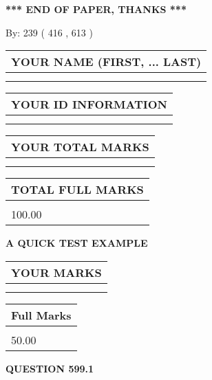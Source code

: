 \documentclass[12pt]{article}
\begin{document}
\vspace{1.0in} 
{\textbf{\large{ *** END OF PAPER, THANKS *** }}} 
   
   
\hspace{1.0in} By: 
 239 ( 416 ,  613 )
   
   
   
   
\newpage 
\setcounter{page}{ 
   599001 } 
   
   
   
   
\noindent\begin{tabular}{|l|}
\hline
YOUR NAME (FIRST, ... LAST)  \\
\hline
 \\ 
 \\ 
\hline
\end{tabular}
\hspace{0.05in} \begin{tabular}{|l|}
\hline
 YOUR   ID   INFORMATION  \\
\hline
 \\ 
 \\ 
\hline
\end{tabular}
   
   
\vspace{0.2in}\noindent\begin{tabular}{|l|}
\hline
YOUR TOTAL MARKS  \\
\hline
 \\ 
 \\ 
\hline
\end{tabular}
\hspace{0.05in} \begin{tabular}{|l|}
\hline
TOTAL FULL MARKS  \\
\hline
 \\ 
100.00 \\
\hline
\end{tabular}
   
   
 \vspace{0.2in}
{\LARGE {\textbf{ A QUICK TEST EXAMPLE}}}
   
   
  
\vspace{0.2in}
  
\noindent\begin{tabular}{|l|}
\hline
 YOUR MARKS  \\
\hline
 \\ 
 \\ 
\hline
\end{tabular}
\hspace{0.05in} \begin{tabular}{|l|}
\hline
 Full Marks  \\
\hline
 \\ 
50.00 \\
\hline
\end{tabular}
{\textbf{\Large{QUESTION
599.1 
}}}
  
\end{document}
